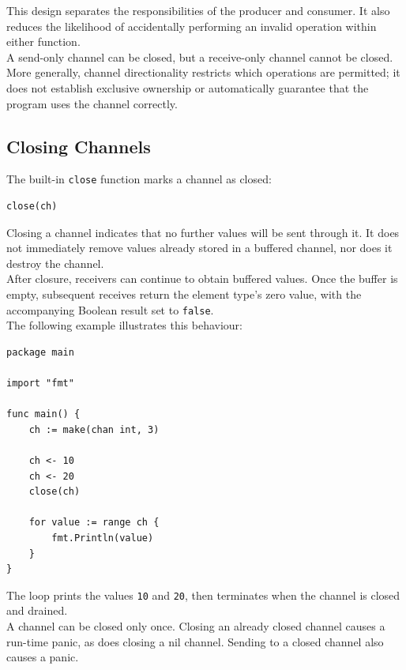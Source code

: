 This design separates the responsibilities of the producer and consumer. It also reduces the likelihood of accidentally performing an invalid operation within either function.\\

A send-only channel can be closed, but a receive-only channel cannot be closed. More generally, channel directionality restricts which operations are permitted; it does not establish exclusive ownership or automatically guarantee that the program uses the channel correctly.\\

\subsection{Closing Channels}

The built-in \texttt{close} function marks a channel as closed:

\begin{lstlisting}
close(ch)
\end{lstlisting}

Closing a channel indicates that no further values will be sent through it. It does not immediately remove values already stored in a buffered channel, nor does it destroy the channel.
\\
After closure, receivers can continue to obtain buffered values. Once the buffer is empty, subsequent receives return the element type's zero value, with the accompanying Boolean result set to \texttt{false}.\\

The following example illustrates this behaviour:

\begin{lstlisting}
package main

import "fmt"

func main() {
    ch := make(chan int, 3)

    ch <- 10
    ch <- 20
    close(ch)

    for value := range ch {
        fmt.Println(value)
    }
}
\end{lstlisting}

The loop prints the values \texttt{10} and \texttt{20}, then terminates when the channel is closed and drained.\\

A channel can be closed only once. Closing an already closed channel causes a run-time panic, as does closing a nil channel. Sending to a closed channel also causes a panic.\\

